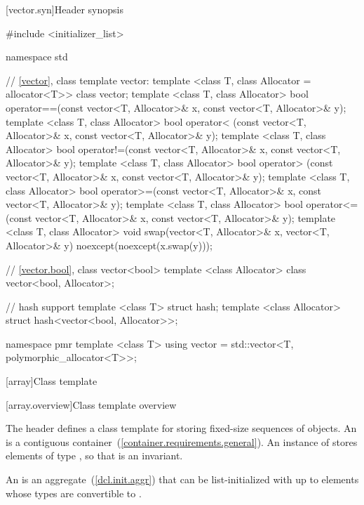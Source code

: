 [vector.syn]{Header  synopsis}


\begin{codeblock}
#include <initializer_list>

namespace std {
  // \ref{vector}, class template vector:
  template <class T, class Allocator = allocator<T>> class vector;
  template <class T, class Allocator>
    bool operator==(const vector<T, Allocator>& x, const vector<T, Allocator>& y);
  template <class T, class Allocator>
    bool operator< (const vector<T, Allocator>& x, const vector<T, Allocator>& y);
  template <class T, class Allocator>
    bool operator!=(const vector<T, Allocator>& x, const vector<T, Allocator>& y);
  template <class T, class Allocator>
    bool operator> (const vector<T, Allocator>& x, const vector<T, Allocator>& y);
  template <class T, class Allocator>
    bool operator>=(const vector<T, Allocator>& x, const vector<T, Allocator>& y);
  template <class T, class Allocator>
    bool operator<=(const vector<T, Allocator>& x, const vector<T, Allocator>& y);
  template <class T, class Allocator>
    void swap(vector<T, Allocator>& x, vector<T, Allocator>& y)
      noexcept(noexcept(x.swap(y)));

  // \ref{vector.bool}, class vector<bool>
  template <class Allocator> class vector<bool, Allocator>;

  // hash support
  template <class T> struct hash;
  template <class Allocator> struct hash<vector<bool, Allocator>>;

  namespace pmr {
    template <class T>
      using vector = std::vector<T, polymorphic_allocator<T>>;
  }
}
\end{codeblock}

[array]{Class template }
%

[array.overview]{Class template  overview}

\pnum
{}%
The header  defines a class template for storing fixed-size
sequences of objects.
An  is a contiguous container~(\ref{container.requirements.general}).
An instance of  stores  elements of type ,
so that  is an invariant.

\pnum
{}%
%
An  is an aggregate~(\ref{dcl.init.aggr}) that can be
list-initialized with up
to  elements whose types are convertible to .

